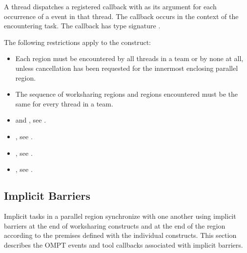 A thread dispatches a registered  callback with 
 as its  argument for each occurrence 
of a  event in that thread. The callback occurs in the 
context of the encountering task. The callback has type signature
. 

\restrictions
The following restrictions apply to the  construct:

\begin{itemize}
\item Each  region must be encountered by all threads in a team 
      or by none at all, unless cancellation has been requested for the innermost 
      enclosing parallel region.
\item The sequence of worksharing regions and  regions encountered 
      must be the same for every thread in a team.
\end{itemize}

\crossreferences
\begin{itemize}
\item {} and , see
.

\item {}, see
.

\item {}, see
.

\item {}, see
.

\end{itemize}






\subsection{Implicit Barriers}
\label{subsec:implict-barrier}

Implicit tasks in a parallel region synchronize with one another using
implicit barriers at the end of worksharing constructs and at the end
of the  region according to the premises defined with
the individual constructs. This section describes the OMPT events and
tool callbacks associated with implicit barriers.

